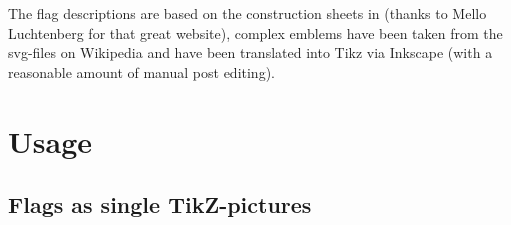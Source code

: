 \documentclass[11pt,a4paper,headsepline,fleqn]{scrreprt}
\begin{document}
The flag descriptions are based on the construction sheets in
\cite{VEXILLAMUNDI}
(thanks to Mello Luchten\-berg for that great website),
complex emblems have been taken from the svg-files on Wikipedia
and have been translated into Tikz via Inkscape
(with a reasonable amount of manual post editing).

\chapter{Usage}

\section{Flags as single TikZ-pictures}
\end{document}
